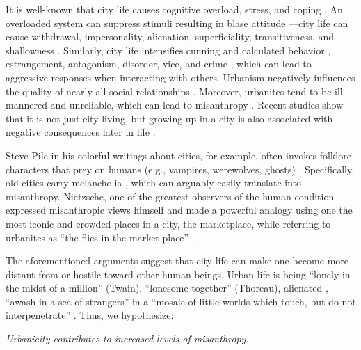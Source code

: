 \documentclass[11pt, letterpaper]{article}
\begin{document}
\begin{spacing}{1.4}
It is well-known that city life causes cognitive overload, stress, and coping \citep{simmel03, milgram70,lederbogen11}. An overloaded system can suppress stimuli resulting in blase attitude
\citep{simmel03}---city life can cause withdrawal, impersonality, alienation, superficiality, transitiveness, and shallowness \citep{wirth38}. Similarly, city life intensifies cunning and calculated behavior \citep{tonnies57}, estrangement, antagonism, disorder, vice, and crime
\citep{milgram70,park15,park84,bettencourt10b}, which can lead to aggressive
responses when interacting with others.
%
Urbanism negatively influences the quality of nearly all social relationships
\citep{wilson85}. Moreover, urbanites tend to be ill-mannered and unreliable,
which can lead to misanthropy
\citep[e.g.,][]{aokCityBook15,aok-sizeFetish17}. Recent studies show that it is not just city living, but growing up in a city is also associated with negative consequences later in life \citep{lederbogen11,aok20}.

Steve Pile in his colorful writings about cities, for example, often invokes
folklore characters that prey on humans (e.g., vampires, werewolves, ghosts)  \citep{pile05,pile05B,pile99}.
%
Specifically, old cities carry melancholia \citep{pile05B}, which can arguably easily translate into misanthropy.
%
Nietzsche, one of the greatest observers of the human condition expressed misanthropic views
himself \citep[e.g.,][]{avramenko2004zarathustra} %
 and made a powerful analogy using one the most iconic and crowded places in a city, the marketplace, while referring to urbanites as ``the flies in the market-place'' \citep{nietzsche05}. 

The aforementioned arguments suggest that city life can make one become more distant from or hostile toward other human beings. 
Urban life is being ``lonely in the midst of a million'' (Twain), ``lonesome together''
(Thoreau), alienated \citep{wirth38,nettler1957measure}, ``awash in a sea of strangers''
\citep[Merry cited in][p. 99]{wilson85} in a ``mosaic of little worlds which touch, but do not interpenetrate'' \citep[][p. 40]{park84}. Thus, we hypothesize:
 
{\indent\hspace{1in}\textit{Urbanicity contributes to increased levels of misanthropy.}}


\end{spacing}
\end{document}
